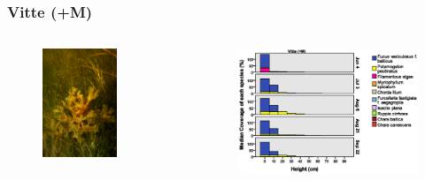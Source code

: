 \documentclass{beamer}
\begin{document}
\begin{frame}
\frametitle{Vitte (+M)}
\begin{columns}
\begin{column}{4.8cm}
\begin{figure}
\includegraphics[width=0.7\textwidth]{images/Fotos/DSCF0799.JPG}
\end{figure}
\end{column}
\begin{column}{8.0cm}
\begin{figure}
\includegraphics[width=\textwidth]{images/Wuchshoehenkartierung/Vitte+Mb1.eps}
\end{figure}
\end{column}
\end{columns}
\end{frame}
\end{document}
